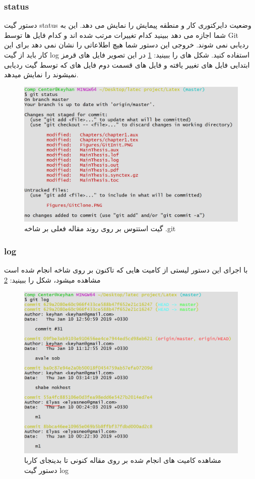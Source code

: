 \subsubsection{status}
دستور گیت status  وضعیت دایرکتوری کار و منطقه پیمایش را نمایش می دهد. این به شما اجازه می دهد ببینید کدام تغییرات مرتب شده اند و کدام فایل ها توسط Git ردیابی نمی شوند. خروجی این دستور شما هیچ اطلاعاتی را نشان نمی دهد برای این کار باید از گیت log استفاده کنید. شکل های را ببینید: \ref{Fig:GitStatus} در این تصویر فایل های قرمز ابتدایی فایل های تغییر یافته و فایل های قسمت دوم فایل های که توسط گیت ردیابی نمیشوند را نمایش میدهد.  
\begin{figure}[tbh]
	\centering
	\includegraphics[width=1\textwidth]{./Figures/GitStatus}
	\caption{ گیت استتوس بر روی روند مقاله فعلی بر شاخه .git }
	\label{Fig:GitStatus}
\end{figure}
\newpage
\subsubsection{log}
با اجرای این دستور لیستی از کامیت هایی که تاکنون بر روی شاخه انجام شده است مشاهده میشود، شکل را ببینید: \ref{Fig:GitLog}
\begin{figure}[tbh]
	\centering
	\includegraphics[width=1\textwidth]{./Figures/GitLog}
	\caption{  مشاهده کامیت های انجام شده بر روی مقاله کنونی تا بدینجای کاربا دستور گیت log }
	\label{Fig:GitLog}
\end{figure}
